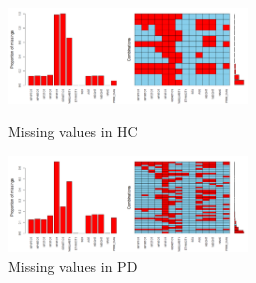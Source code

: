 \documentclass[]{article}
\begin{document}
\begin{figure}[h]
	\centering
	\parbox{2.8in}{
		\centering
		\includegraphics[width=2.5in]{../missing_values_hc}
		\caption{Missing values in HC}
		\label{fig:miss_val_hc}}
	\begin{minipage}{2.8in}
		\centering
		\includegraphics[width=2.5in]{../missing_values_pd}
		\caption{Missing values in PD}
		\label{fig:miss_val_pd}
	\end{minipage}
\end{figure}
\end{document}
